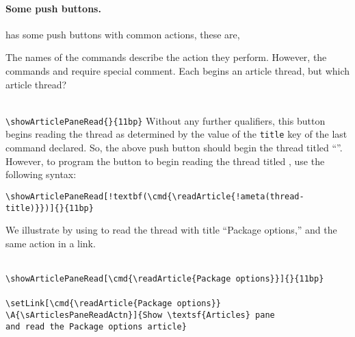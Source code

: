 \documentclass{article}
\makeatletter
\renewenvironment{quote}[1][]
   {\def\@rgi{#1}\ifx\@rgi\@empty
    \let\rghtm\@empty\else\def\rghtm{\rightmargin\leftmargin}\fi
    \list{}{\rghtm} %
    \item\relax}
   {\endlist}
\makeatother
\begin{document}
\paragraph*{Some push buttons.}  has some push buttons with common actions,
these are,
\bVerb{}%
\begin{dCmd}[commandchars=!()]{\bxSize}
\end{dCmd}
\eVerb The names of the commands describe the action they perform. However,
the commands  and  require special comment.
Each begins an article thread, but which article thread?
\begin{quote}%
    \showArticlePaneRead{}{11bp}\\[2bp]
    \verb!\showArticlePaneRead{}{11bp}!
\end{quote}
Without any further qualifiers, this button begins reading the thread as
determined by the value of the \texttt{title} key of the last
 command declared. So, the above push button should begin
the thread titled ``\threadTitle''. However, to program the button to begin
reading the thread titled , use the following syntax:
\begin{Verbatim}[xleftmargin=\amtIndent,commandchars=!()]
\showArticlePaneRead[!textbf(\cmd{\readArticle{!ameta(thread-title)}})]{}{11bp}
\end{Verbatim}
We illustrate by using  to read the thread with title
``Package options,'' and the same action in a link.
\begin{quote} %
    \\[2bp]
    \verb~\showArticlePaneRead[\cmd{\readArticle{Package options}}]{}{11bp}~\\[4bp]
    \\[2bp]
    \verb~\setLink[\cmd{\readArticle{Package options}}~\\
    \null\quad\verb~\A{\sArticlesPaneReadActn}]{Show \textsf{Articles} pane~\\
    \null\quad\verb~and read the Package options article}~
\end{quote}
\end{document}
